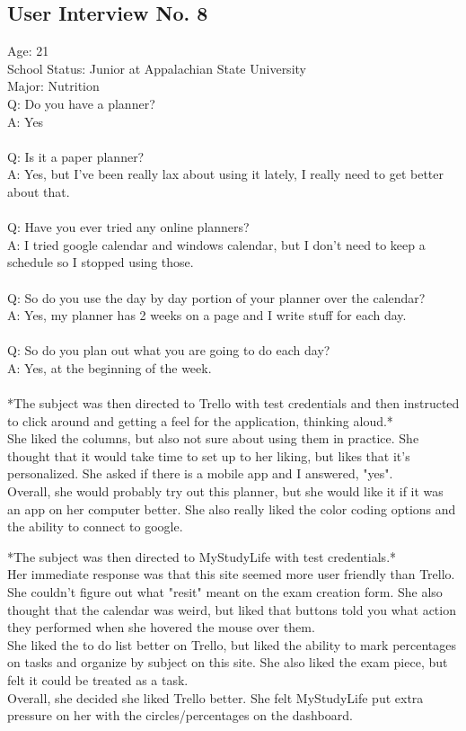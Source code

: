 \subsection{User Interview No. 8}
Age: 21\\
School Status: Junior at Appalachian State University\\
Major: Nutrition
\\
Q: Do you have a planner?\\
A: Yes\\ \\
Q: Is it a paper planner?\\
A: Yes, but I've been really lax about using it lately, I really need to get better about that.\\ \\
Q: Have you ever tried any online planners?\\
A: I tried google calendar and windows calendar, but I don't need to keep a schedule so I stopped using those.\\ \\
Q: So do you use the day by day portion of your planner over the calendar?\\
A: Yes, my planner has 2 weeks on a page and I write stuff for each day.\\ \\
Q: So do you plan out what you are going to do each day?\\
A: Yes, at the beginning of the week.\\ \\

*The subject was then directed to Trello with test credentials and then instructed to click around and getting a feel for the application, thinking aloud.*\\

She liked the columns, but also not sure about using them in practice. She thought that it would take time to set up to her liking, but likes that it's personalized. She asked if there is a mobile app and I answered, "yes".\\
Overall, she would probably try out this planner, but she would like it if it was an app on her computer better. She also really liked the color coding options and the ability to connect to google.

*The subject was then directed to MyStudyLife with test credentials.*\\
Her immediate response was that this site seemed more user friendly than Trello. She couldn't figure out what "resit" meant on the exam creation form. She also thought that the calendar was weird, but liked that buttons told you what action they performed when she hovered the mouse over them.\\
She liked the to do list better on Trello, but liked the ability to mark percentages on tasks and organize by subject on this site. She also liked the exam piece, but felt it could be treated as a task.\\ 
Overall, she decided she liked Trello better. She felt MyStudyLife put extra pressure on her with the circles/percentages on the dashboard.


